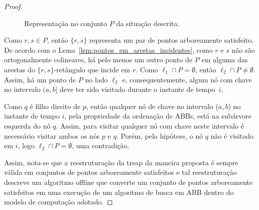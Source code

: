 \begin{proof}
\begin{figure}
\begin{adjustbox}{valign=t, raise=-25pt}
    \end{adjustbox}
    \caption{Representação no conjunto $P$ da situação descrita.}
\label{fig:area_delimitada}
\end{figure}

Como $r,s \in P$, então $\{r,s\}$ representa um par de pontos arboreamente satisfeito. De acordo com o Lema~\ref{lem:pontos_em_arestas_incidentes}, como $r$ e $s$ não são ortogonalmente colineares, há pelo menos um outro ponto de $P$ em alguma das arestas do $\{r,s\}$-retângulo que incide em $r$. Como $\ell_1 \cap P = \emptyset$, então $\ell_2 \cap P \neq \emptyset$. Assim, há um ponto de $P$ no lado $\ell_2$ e, consequentemente, algum nó com chave no intervalo $(a,b]$ deve ter sido visitado durante o instante de tempo~$i$.

Como $q$ é filho direito de $p$, então qualquer nó de chave no intervalo ($a,b$) no instante de tempo $i$, pela propriedade da ordenação de ABBs, está na subárvore esquerda do nó $q$. Assim, para visitar qualquer nó com chave neste intervalo é necessário visitar ambos os nós $p$ e $q$. Porém, pela hipótese, o nó $q$ não é visitado em $i$, logo $\ell_2 \cap P = \emptyset$, uma contradição.

Assim, nota-se que a reestruturação da treap da maneira proposta é sempre válida em conjuntos de pontos arboreamente satisfeitos e tal reestruturação descreve um algoritmo offline que converte um conjunto de pontos arboreamente satisfeitos em uma execução de um algoritmo de busca em ABB dentro do modelo de computação adotado.
\end{proof}

